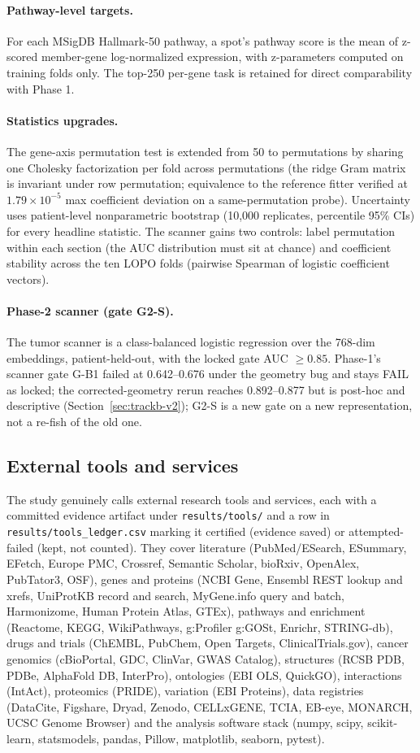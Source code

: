 \documentclass[11pt]{article}
\begin{document}
\paragraph{Pathway-level targets.} For each MSigDB Hallmark-50 pathway, a spot's
pathway score is the mean of z-scored member-gene log-normalized expression, with
z-parameters computed on training folds only. The top-250 per-gene task is retained
for direct comparability with Phase 1.
\paragraph{Statistics upgrades.} The gene-axis permutation test is extended from 50
to \pNperm{} permutations by sharing one Cholesky factorization per fold across
permutations (the ridge Gram matrix is invariant under row permutation; equivalence
to the reference fitter verified at $1.79\times10^{-5}$ max coefficient deviation on
a same-permutation probe). Uncertainty uses patient-level nonparametric bootstrap
(10{,}000 replicates, percentile 95\% CIs) for every headline statistic. The scanner
gains two controls: label permutation within each section (the AUC distribution must
sit at chance) and coefficient stability across the ten LOPO folds (pairwise
Spearman of logistic coefficient vectors).
\paragraph{Phase-2 scanner (gate G2-S).} The tumor scanner is a class-balanced
logistic regression over the 768-dim embeddings, patient-held-out, with the locked
gate AUC $\ge 0.85$. Phase-1's scanner gate G-B1 failed at 0.642--0.676 under the
geometry bug and stays FAIL as locked; the corrected-geometry rerun reaches
0.892--0.877 but is post-hoc and descriptive (Section~\ref{sec:trackb-v2}); G2-S is a
new gate on a new representation, not a re-fish of the old one.

\subsection{External tools and services}
The study genuinely calls \numTools{} external research tools and services, each with
a committed evidence artifact under \texttt{results/tools/} and a row in
\texttt{results/tools\_ledger.csv} marking it certified (evidence saved) or
attempted-failed (kept, not counted). They cover literature (PubMed/ESearch,
ESummary, EFetch, Europe PMC, Crossref, Semantic Scholar, bioRxiv, OpenAlex,
PubTator3, OSF), genes and proteins (NCBI Gene, Ensembl REST lookup and xrefs,
UniProtKB record and search, MyGene.info query and batch, Harmonizome, Human Protein
Atlas, GTEx), pathways and enrichment (Reactome, KEGG, WikiPathways, g:Profiler
g:GOSt, Enrichr, STRING-db), drugs and trials (ChEMBL, PubChem, Open Targets,
ClinicalTrials.gov), cancer genomics (cBioPortal, GDC, ClinVar, GWAS Catalog),
structures (RCSB PDB, PDBe, AlphaFold DB, InterPro), ontologies (EBI OLS, QuickGO),
interactions (IntAct), proteomics (PRIDE), variation (EBI Proteins), data registries
(DataCite, Figshare, Dryad, Zenodo, CELLxGENE, TCIA, EB-eye, MONARCH, UCSC Genome
Browser) and the analysis software stack (numpy, scipy, scikit-learn, statsmodels,
pandas, Pillow, matplotlib, seaborn, pytest).
\end{document}
